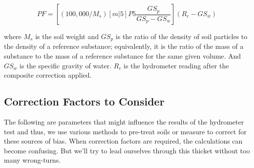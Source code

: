 \documentclass{tufte-handout}
\begin{document}
\begin{equation}
PF = [(100,000/M_s)[m|5]P5 \frac{GS_p}{GS_p - GS_w}](R_c - GS_w)
\end{equation}

\noindent where $M_s$ is the soil weight and $GS_p$ is the ratio of the density of soil particles to the density of a reference substance; equivalently, it is the ratio of the mass of a substance to the mass of a reference substance for the same given volume. And $GS_w$ is the specific gravity of water. $R_c$ is the hydrometer reading after the composite correction applied.


\subsection{Correction Factors to Consider}

The following are parameters that might influence the results of the hydrometer test and thus, we use various methods to pre-treat soils or measure to correct for these sources of bias. When correction factors are required, the calculations can become confusing.	 But we'll try to lead ourselves through this thicket without too many wrong-turns. 
\end{document}
